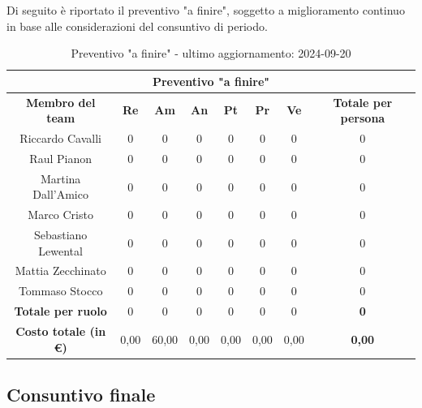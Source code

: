 \begin{minipage}{\textwidth}
Di seguito è riportato il preventivo "a finire", soggetto a miglioramento continuo in base alle considerazioni del consuntivo di periodo.
\begin{table}[H]
  \centering
  \begin{adjustbox}{max width=\textwidth}
  \begin{tabular}{|c|c|c|c|c|c|c|c|}
    \hline
    \multicolumn{8}{|c|}{\textbf{Preventivo "a finire"}} \\
    \hline
    \textbf{Membro del team} & \textbf{Re} & \textbf{Am} & \textbf{An} & \textbf{Pt} & \textbf{Pr} & \textbf{Ve} & \textbf{Totale per persona} \\
    \hline
    Riccardo Cavalli & 0 & 0 & 0 & 0 & 0 & 0 & 0 \\
    \hline
    Raul Pianon & 0 & 0 & 0 & 0 & 0 & 0 & 0 \\
    \hline
    Martina Dall'Amico & 0 & 0 & 0 & 0 & 0 & 0 & 0 \\
    \hline
    Marco Cristo & 0 & 0 & 0 & 0 & 0 & 0 & 0 \\
    \hline
    Sebastiano Lewental & 0 & 0 & 0 & 0 & 0 & 0 & 0 \\
    \hline
    Mattia Zecchinato & 0 & 0 & 0 & 0 & 0 & 0 & 0 \\
    \hline
    Tommaso Stocco & 0 & 0 & 0 & 0 & 0 & 0 & 0 \\
    \hline
    \textbf{Totale per ruolo} & 0 & 0 & 0 & 0 & 0 & 0 & \textbf{0} \\
    \hline
    \textbf{Costo totale (in €)} & 0,00 & 60,00 & 0,00 & 0,00 & 0,00 & 0,00 & \textbf{0,00} \\
    \hline
  \end{tabular}
  \end{adjustbox}
  \caption{Preventivo "a finire" - ultimo aggiornamento: 2024-09-20}\label{tab:preventivo-a-finire}
\end{table}
\end{minipage}


\subsection{Consuntivo finale}\label{sec:consuntivo-finale}

